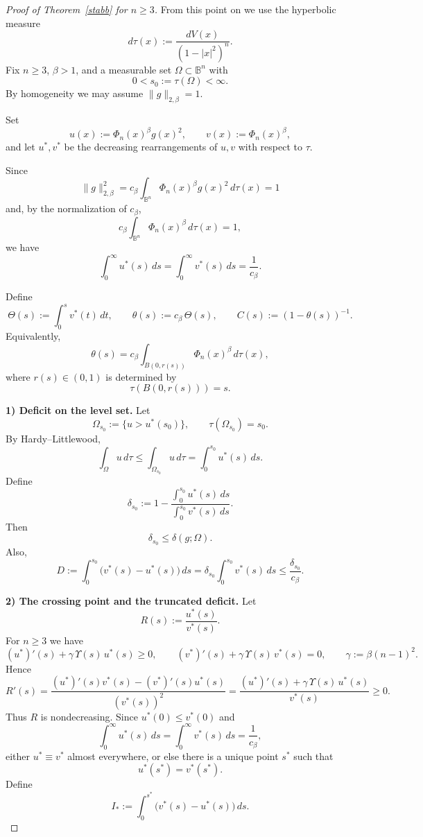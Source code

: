 \documentclass[a4paper,10pt]{amsart}
\begin{document}
\begin{proof}[Proof of Theorem~\ref{stabb} for $n\ge 3$]
From this point on we use the hyperbolic measure
\[
d\tau(x):=\frac{dV(x)}{(1-|x|^2)^n}.
\]
Fix $n\ge 3$, $\beta>1$, and a measurable set $\Omega\subset\mathbb B^n$ with
\[
0<s_0:=\tau(\Omega)<\infty.
\]
By homogeneity we may assume $\|g\|_{2,\beta}=1$.

Set
\[
u(x):=\Phi_n(x)^\beta g(x)^2,
\qquad
v(x):=\Phi_n(x)^\beta,
\]
and let $u^*,v^*$ be the decreasing rearrangements of $u,v$ with respect to $\tau$.

Since
\[
\|g\|_{2,\beta}^2
=
c_\beta\int_{\mathbb B^n}\Phi_n(x)^\beta g(x)^2\,d\tau(x)=1
\]
and, by the normalization of $c_\beta$,
\[
c_\beta\int_{\mathbb B^n}\Phi_n(x)^\beta\,d\tau(x)=1,
\]
we have
\[
\int_0^\infty u^*(s)\,ds=\int_0^\infty v^*(s)\,ds=\frac1{c_\beta}.
\]

Define
\[
\Theta(s):=\int_0^s v^*(t)\,dt,
\qquad
\theta(s):=c_\beta\,\Theta(s),
\qquad
C(s):=(1-\theta(s))^{-1}.
\]
Equivalently,
\[
\theta(s)
=
c_\beta\int_{B(0,r(s))}\Phi_n(x)^\beta\,d\tau(x),
\]
where $r(s)\in(0,1)$ is determined by
\[
\tau(B(0,r(s)))=s.
\]

\smallskip\noindent
\textbf{1) Deficit on the level set.}
Let
\[
\Omega_{s_0}:=\{u>u^*(s_0)\},
\qquad
\tau(\Omega_{s_0})=s_0.
\]
By Hardy--Littlewood,
\[
\int_\Omega u\,d\tau\le \int_{\Omega_{s_0}}u\,d\tau=\int_0^{s_0}u^*(s)\,ds.
\]
Define
\[
\delta_{s_0}
:=
1-\frac{\displaystyle\int_0^{s_0}u^*(s)\,ds}
{\displaystyle\int_0^{s_0}v^*(s)\,ds}.
\]
Then
\[
\delta_{s_0}\le \delta(g;\Omega).
\]
Also,
\begin{equation}\label{eq:D-def-ng3}
D:=\int_0^{s_0}\bigl(v^*(s)-u^*(s)\bigr)\,ds
=
\delta_{s_0}\int_0^{s_0}v^*(s)\,ds
\le \frac{\delta_{s_0}}{c_\beta}.
\end{equation}

\smallskip\noindent
\textbf{2) The crossing point and the truncated deficit.}
Let
\[
R(s):=\frac{u^*(s)}{v^*(s)}.
\]
For $n\ge3$ we have
\[
(u^*)'(s)+\gamma\,\Upsilon(s)\,u^*(s)\ge0,
\qquad
(v^*)'(s)+\gamma\,\Upsilon(s)\,v^*(s)=0,
\qquad
\gamma:=\beta(n-1)^2.
\]
Hence
\[
R'(s)
=
\frac{(u^*)'(s)v^*(s)-(v^*)'(s)u^*(s)}{(v^*(s))^2}
=
\frac{(u^*)'(s)+\gamma\,\Upsilon(s)\,u^*(s)}{v^*(s)}
\ge0.
\]
Thus $R$ is nondecreasing. Since $u^*(0)\le v^*(0)$ and
\[
\int_0^\infty u^*(s)\,ds=\int_0^\infty v^*(s)\,ds=\frac1{c_\beta},
\]
either $u^*\equiv v^*$ almost everywhere, or else there is a unique point $s^*$ such that
\[
u^*(s^*)=v^*(s^*).
\]
Define
\[
I_*:=\int_0^{s^*}\bigl(v^*(s)-u^*(s)\bigr)\,ds.
\]


\end{proof}
\end{document}
